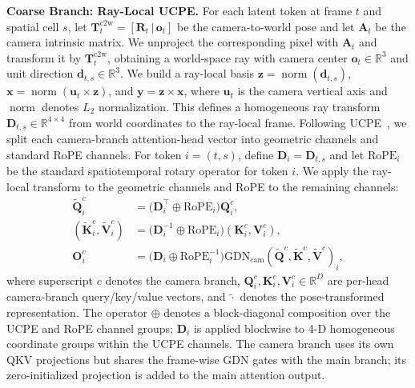 \noindent \textbf{Coarse Branch: Ray-Local UCPE.}
For each latent token at frame $t$ and spatial cell $s$, let $\mathbf{T}^{\mathrm{c2w}}_t=[\mathbf{R}_t\,|\,\mathbf{o}_t]$ be the camera-to-world pose and let $\mathbf{A}_t$ be the camera intrinsic matrix.
We unproject the corresponding pixel with $\mathbf{A}_t$ and transform it by $\mathbf{T}^{\mathrm{c2w}}_t$, obtaining a world-space ray with camera center $\mathbf{o}_{t}\in\mathbb{R}^{3}$ and unit direction $\mathbf{d}_{t,s}\in\mathbb{R}^{3}$.
We build a ray-local basis $\mathbf{z}=\operatorname{norm}(\mathbf{d}_{t,s})$, $\mathbf{x}=\operatorname{norm}(\mathbf{u}_{t}\times\mathbf{z})$, and $\mathbf{y}=\mathbf{z}\times\mathbf{x}$, where $\mathbf{u}_{t}$ is the camera vertical axis and $\operatorname{norm}$ denotes $L_2$ normalization.
This defines a homogeneous ray transform $\mathbf{D}_{t,s}\in\mathbb{R}^{4\times4}$ from world coordinates to the ray-local frame.
Following UCPE~\citep{ucpe}, we split each camera-branch attention-head vector into geometric channels and standard RoPE channels.
For token $i=(t,s)$, define $\mathbf{D}_i=\mathbf{D}_{t,s}$ and let $\mathrm{RoPE}_i$ be the standard spatiotemporal rotary operator for token $i$.
We apply the ray-local transform to the geometric channels and RoPE to the remaining channels:
\begin{equation}
\begin{aligned}
\widetilde{\mathbf{Q}}^{c}_{i} &=
  \big(\mathbf{D}_{i}^{\top}\oplus \mathrm{RoPE}_{i}\big)\mathbf{Q}^{c}_{i},\\
(\widetilde{\mathbf{K}}^{c}_{i},\widetilde{\mathbf{V}}^{c}_{i}) &=
  \big(\mathbf{D}_{i}^{-1}\oplus \mathrm{RoPE}_{i}\big)(\mathbf{K}^{c}_{i},\mathbf{V}^{c}_{i}),\\
\mathbf{O}^{c}_{i} &=
  \big(\mathbf{D}_{i}\oplus \mathrm{RoPE}_{i}^{-1}\big)
  \mathrm{GDN}_{\mathrm{cam}}(\widetilde{\mathbf{Q}}^{c},\widetilde{\mathbf{K}}^{c},\widetilde{\mathbf{V}}^{c})_{i},
\end{aligned}
\label{eq:ucpe_camera_branch}
\end{equation}
where superscript $c$ denotes the camera branch, $\mathbf{Q}^c_i,\mathbf{K}^c_i,\mathbf{V}^c_i\in\mathbb{R}^{D}$ are per-head camera-branch query/key/value vectors, and $\widetilde{\cdot}$ denotes the pose-transformed representation.
The operator $\oplus$ denotes a block-diagonal composition over the UCPE and RoPE channel groups; $\mathbf{D}_i$ is applied blockwise to 4-D homogeneous coordinate groups within the UCPE channels.
The camera branch uses its own QKV projections but shares the frame-wise GDN gates with the main branch; its zero-initialized projection is added to the main attention output.

